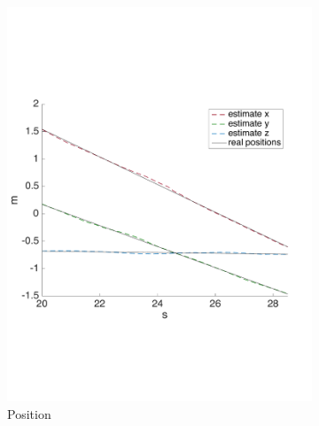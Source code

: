 \begin{figure}[!htbp]
  \centering
   \begin{subfigure}[b]{0.45\textwidth}
        \includegraphics[width=\textwidth]{img/tag_moving_real_world_pos.pdf}
        \caption{Position }
        \label{fig:one_ekf_real_world_moving}
   \end{subfigure}\hfill
   \begin{subfigure}[b]{0.45\textwidth}

\end{subfigure}
\end{figure}
